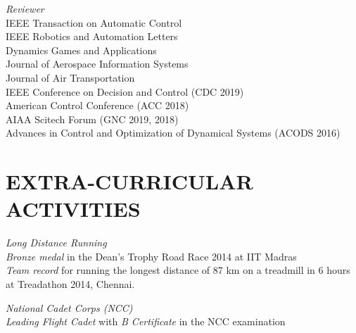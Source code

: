 \documentclass[margin, 10pt]{res} %
\begin{document}
\begin{resume}
{\sl Reviewer}\\
IEEE Transaction on Automatic Control\\
IEEE Robotics and Automation Letters \\
Dynamics Games and Applications\\
Journal of Aerospace Information Systems\\
Journal of Air Transportation\\
IEEE Conference on Decision and Control (CDC 2019)\\
American Control Conference (ACC 2018)\\
AIAA Scitech Forum (GNC 2019, 2018)\\
Advances in Control and Optimization of Dynamical Systems (ACODS 2016)


\section{EXTRA-CURRICULAR ACTIVITIES} 

{\sl Long Distance Running}\\
\emph{Bronze medal} in the Dean’s Trophy Road Race 2014 at IIT Madras \\ 
\emph{Team record} for running the longest distance of 87 km on a treadmill in 6 hours at Treadathon 2014,
Chennai.

{\sl National Cadet Corps (NCC)}\\
\emph{Leading Flight Cadet} with \emph{B Certificate} in the NCC examination


%
%

\end{resume}
\end{document}
